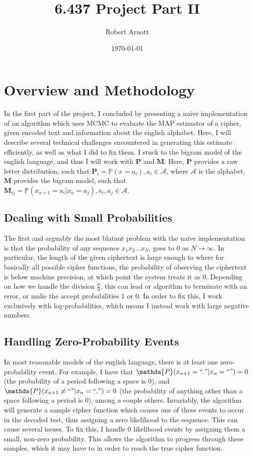 \documentclass[secnumaric,notitlepage,amsmath,amssymb,nofootinbib,floatfix,12pt]{revtex4-1}
\begin{document}
\title{6.437 Project Part II}
\author{Robert Arnott}
\date{\today}

\maketitle
\section*{Overview and Methodology}
In the first part of the project, I concluded by presenting a naive implementation of an algorithm which uses MCMC to evaluate the MAP estimator of a cipher, given encoded text and information about the english alphabet. Here, I will describe several technical challenges encountered in generating this estimate efficiently, as well as what I did to fix them. I stuck to the bigram model of the english language, and thus I will work with $\mathbf{P}$ and $\mathbf{M}$. Here, $\mathbf{P}$ provides a raw letter distribution, such that $\mathbf{P}_i = \mathds{P}(x = a_i), a_i \in \mathcal{A}$, where $\mathcal{A}$ is the alphabet. $\mathbf{M}$ provides the bigram model, such that $\mathbf{M}_{ij} = \mathds{P}(x_{n+1} = a_i | x_n = a_j), a_i,a_j \in \mathcal{A}$.

\subsection*{Dealing with Small Probabilities}
The first and arguably the most blatant problem with the naive implementation is that the probability of any sequence $x_1 x_2 ... x_N$, goes to 0 as $N \to \infty$. In particular, the length of the given ciphertext is large enough to where for basically all possible cipher functions, the probability of observing the ciphertext is below machine precision, at which point the system treats it as 0. Depending on how we handle the division $\frac{0}{0}$, this can lead or algorithm to terminate with an error, or make the accept probabilities 1 or 0. In order to fix this, I work exclusively with log-probabilities, which means I instead work with large negative numbers.

\subsection*{Handling Zero-Probability Events}
In most reasonable models of the english language, there is at least one zero-probability event. For example, I have that $\mathds{P}(x_{n+1} = ``." | x_n = `` ") = 0$ (the probability of a period following a space is 0), and $\mathds{P}(x_{n+1} \neq `` " | x_n = ``.") = 0$ (the probability of anything other than a space following a period is 0), among a couple others. Invariably, the algorithm will generate a sample cipher function which causes one of these events to occur in the decoded test, thus assigning a zero likelihood to the sequence. This can cause several issues. To fix this, I handle 0 likelihood events by assigning them a small, non-zero probability. This allows the algorithm to progress through these samples, which it may have to in order to reach the true cipher function.
\end{document}
